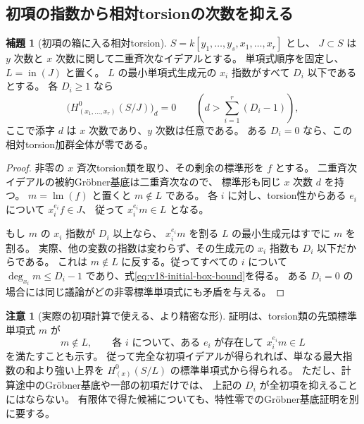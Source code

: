 \documentclass[a4paper,11pt]{ltjsarticle}
\theoremstyle{definition}
\newtheorem{lemma}[theorem]{補題}
\newtheorem{remark}[theorem]{注意}
\begin{document}
\subsection{初項の指数から相対torsionの次数を抑える}

\begin{lemma}[初項の箱に入る相対torsion]
\label{lem:v18-initial-box-torsion}
$S=k[y_1,\ldots,y_s,x_1,\ldots,x_r]$ とし、
$J\subset S$ は $y$ 次数と $x$ 次数に関して二重斉次なイデアルとする。
単項式順序を固定し、$L=\operatorname{in}(J)$ と置く。
$L$ の最小単項式生成元の $x_i$ 指数がすべて $D_i$ 以下であるとする。
各 $D_i\ge1$ なら
\begin{equation}\label{eq:v18-initial-box-bound}
 \bigl(H^0_{(x_1,\ldots,x_r)}(S/J)\bigr)_d=0
 \qquad\left(d>\sum_{i=1}^r(D_i-1)\right),
\end{equation}
ここで添字 $d$ は $x$ 次数であり、$y$ 次数は任意である。
ある $D_i=0$ なら、この相対torsion加群全体が零である。
\end{lemma}

\begin{proof}
非零の $x$ 斉次torsion類を取り、その剰余の標準形を $f$ とする。
二重斉次イデアルの被約Gr\"obner基底は二重斉次なので、
標準形も同じ $x$ 次数 $d$ を持つ。
$m=\operatorname{lm}(f)$ と置くと $m\notin L$ である。
各 $i$ に対し、torsion性からある $e_i$ について $x_i^{e_i}f\in J$、
従って $x_i^{e_i}m\in L$ となる。

もし $m$ の $x_i$ 指数が $D_i$ 以上なら、
$x_i^{e_i}m$ を割る $L$ の最小生成元はすでに $m$ を割る。
実際、他の変数の指数は変わらず、その生成元の $x_i$ 指数も $D_i$ 以下だからである。
これは $m\notin L$ に反する。従ってすべての $i$ について
$\deg_{x_i}m\le D_i-1$ であり、式\eqref{eq:v18-initial-box-bound}を得る。
ある $D_i=0$ の場合には同じ議論がどの非零標準単項式にも矛盾を与える。
\end{proof}

\begin{remark}[実際の初項計算で使える、より精密な形]
\label{rem:v18-initial-torsion-certificate}
証明は、torsion類の先頭標準単項式 $m$ が
\[
 m\notin L,\qquad
 \text{各 }i\text{ について、ある }e_i\text{ が存在して }x_i^{e_i}m\in L
\]
を満たすことも示す。
従って完全な初項イデアルが得られれば、単なる最大指数の和より強い上界を
$H^0_{(x)}(S/L)$ の標準単項式から得られる。
ただし、計算途中のGr\"obner基底や一部の初項だけでは、
上記の $D_i$ が全初項を抑えることにはならない。
有限体で得た候補についても、特性零でのGr\"obner基底証明を別に要する。
\end{remark}
\end{document}

